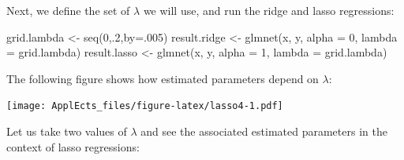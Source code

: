 \documentclass[
  12pt,
]{book}
\newenvironment{Shaded}{\begin{snugshade}}{\end{snugshade}}
\newcommand{\AttributeTok}[1]{\textcolor[rgb]{0.77,0.63,0.00}{#1}}
\newcommand{\DecValTok}[1]{\textcolor[rgb]{0.00,0.00,0.81}{#1}}
\newcommand{\FunctionTok}[1]{\textcolor[rgb]{0.00,0.00,0.00}{#1}}
\newcommand{\NormalTok}[1]{#1}
\newcommand{\OtherTok}[1]{\textcolor[rgb]{0.56,0.35,0.01}{#1}}
\newcommand{\SpecialCharTok}[1]{\textcolor[rgb]{0.00,0.00,0.00}{#1}}
\newcommand{\StringTok}[1]{\textcolor[rgb]{0.31,0.60,0.02}{#1}}
\theoremstyle{definition}
\theoremstyle{definition}
\theoremstyle{definition}
\theoremstyle{definition}
\theoremstyle{remark}
\begin{document}
Next, we define the set of \(\lambda\) we will use, and run the ridge and lasso regressions:

\begin{Shaded}
\begin{Highlighting}[]
\NormalTok{grid.lambda }\OtherTok{\textless{}{-}} \FunctionTok{seq}\NormalTok{(}\DecValTok{0}\NormalTok{,.}\DecValTok{2}\NormalTok{,}\AttributeTok{by=}\NormalTok{.}\DecValTok{005}\NormalTok{)}
\NormalTok{result.ridge }\OtherTok{\textless{}{-}} \FunctionTok{glmnet}\NormalTok{(x, y, }\AttributeTok{alpha =} \DecValTok{0}\NormalTok{, }\AttributeTok{lambda =}\NormalTok{ grid.lambda)}
\NormalTok{result.lasso }\OtherTok{\textless{}{-}} \FunctionTok{glmnet}\NormalTok{(x, y, }\AttributeTok{alpha =} \DecValTok{1}\NormalTok{, }\AttributeTok{lambda =}\NormalTok{ grid.lambda)}
\end{Highlighting}
\end{Shaded}

The following figure shows how estimated parameters depend on \(\lambda\):

\begin{Shaded}
\end{Shaded}

\texttt{[image: ApplEcts\_files/figure-latex/lasso4-1.pdf]}

Let us take two values of \(\lambda\) and see the associated estimated parameters in the context of lasso regressions:
\end{document}

